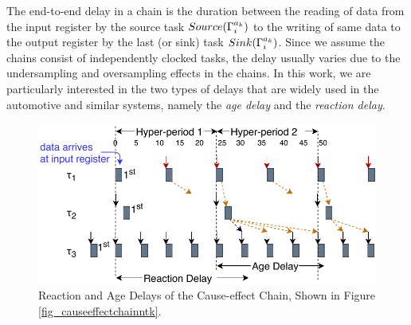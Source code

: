 {The end-to-end delay in a chain is the duration between the reading of data from the input register by the source task $Source(\sss{\Gamma})$ to the writing of same data to the output register by the last (or sink) task $Sink(\sss{\Gamma})$. Since we assume the chains consist of independently clocked tasks, the delay usually varies due to the undersampling and oversampling effects in the chains. In this work, we are particularly interested in the two types of delays that are widely used in the automotive and similar systems, namely the \textit{age delay} and the \textit{reaction delay}. 
\begin{figure}
	\centering
	\includegraphics[width=0.9\linewidth]{img/timedchain_ntk}
	\caption{Reaction and Age Delays of the Cause-effect Chain, Shown in Figure {\ref{fig_causeeffectchainntk}}.}
	\label{fig_timedchainntk}
\end{figure}

}
